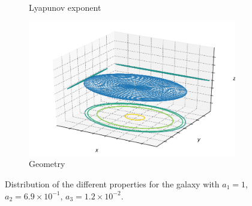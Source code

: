 \begin{figure}[h]
\begin{subfigure}[t]{0.4\textwidth}
        \caption{Lyapunov exponent}
    \end{subfigure}
    \begin{subfigure}[t]{0.4\textwidth}
        \includegraphics[width=\textwidth]{"../Files/Week 13/images/3_ellipsoid"}
        \caption{Geometry}
    \end{subfigure}
    \caption{Distribution of the different properties for the galaxy with $a_1 = 1$, $a_2 = 6.9\times10^{-1}$, $a_3 = 1.2\times10^{-2}$.}
    \label{fig: g5}
\end{figure}


